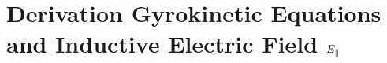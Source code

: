 
\chapter{Derivation Gyrokinetic Equations and Inductive Electric Field $E_\parallel$}
\label{chap:theory}

\thispagestyle{empty}
\newpage
